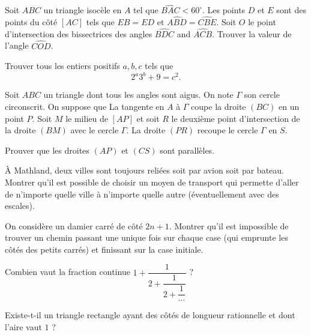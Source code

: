 \begin{exo}{}
Soit $ABC$ un triangle isocèle en $A$ tel que $\widehat{BAC}<60^{\circ}$. Les points $D$ et $E$ sont des points du côté $[AC]$ tels que $EB=ED$ et $\widehat{ABD}=\widehat{CBE}$. Soit $O$ le point d'intersection des bissectrices des angles $\widehat{BDC}$ and $\widehat{ACB}$. Trouver la valeur de l'angle $\widehat{COD}$.
\end{exo}

\begin{exo}{}Trouver tous les entiers positifs $a,b,c$ tels que $$ 2^{a}3^{b}+9 = c^{2}.$$
\end{exo} 

\begin{exo}{} Soit $ABC$ un triangle dont tous les angles sont aigus. On note $ \Gamma$ son cercle circonscrit. On suppose que La tangente en $A$ à $\Gamma$ coupe la droite $(BC)$ en un point $P$. Soit $M$ le milieu de $[AP]$ et soit $R$ le deuxième point d'intersection de la droite $(BM)$ avec le cercle $ \Gamma$. La droite $(PR)$ recoupe le cercle $ \Gamma$ en $S$.

Prouver que les droites $(AP)$ et $(CS)$ sont parallèles.
\end{exo}


\begin{exo}{} 
 \`A Mathland, deux villes sont toujours reliées soit par avion soit par bateau. Montrer qu'il est possible de choisir un moyen de transport qui permette d'aller de n'importe quelle ville à n'importe quelle autre (éventuellement avec des escales).
 \end{exo}

\begin{exo}{} On considère un damier carré de côté $2n+1$. Montrer qu'il est impossible de trouver un chemin passant une unique fois sur chaque case (qui emprunte les côtés des petits carrés) et finissant sur la case initiale.
\end{exo}


\begin{exo}{} 
Combien vaut la fraction continue $1+\dfrac{1}{2+\dfrac{1}{2+\dfrac{1}{\cdots}}}$ ?
\end{exo}




\begin{exo}{}
Existe-t-il un triangle rectangle ayant des côtés de longueur rationnelle et dont l'aire vaut $1$ ?
\end{exo}

